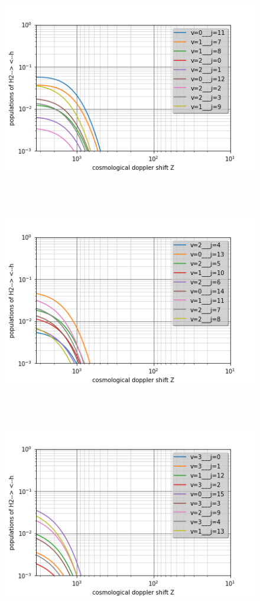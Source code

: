 \documentclass[10pt, a4paper]{report}
\numberwithin{equation}{subsection}
\begin{document}
\begin{figure}[]
\centering
\includegraphics[width=14.0cm,height=9cm]{levelsh2-h.2.png}
\end{figure}
\begin{figure}[]
\centering
\includegraphics[width=14.0cm,height=9cm]{levelsh2-h.3.png}
\end{figure}
\begin{figure}[]
\centering
\includegraphics[width=14.0cm,height=9cm]{levelsh2-h.4.png}
\end{figure}
\end{document}
